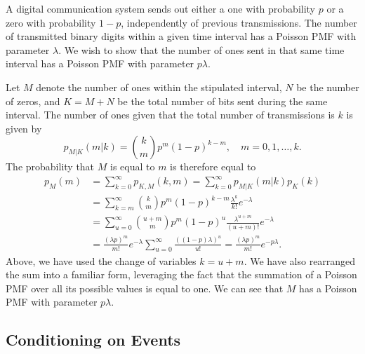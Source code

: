 \begin{example}
A digital communication system sends out either a one with probability $p$ or a zero with probability $1 - p$, independently of previous transmissions.
The number of transmitted binary digits within a given time interval has a Poisson PMF with parameter $\lambda$.
We wish to show that the number of ones sent in that same time interval has a Poisson PMF with parameter $p \lambda$.

Let $M$ denote the number of ones within the stipulated interval, $N$ be the number of zeros, and $K = M + N$ be the total number of bits sent during the same interval.
The number of ones given that the total number of transmissions is $k$ is given by
\begin{equation*}
p_{M|K} (m | k) = \binom{k}{m} p^m (1-p)^{k - m},
\quad m = 0, 1, \ldots, k.
\end{equation*}
The probability that $M$ is equal to $m$ is therefore equal to
\begin{equation*}
\begin{split}
p_{M} (m) &= \sum_{k = 0}^{\infty} p_{K,M} (k, m)
= \sum_{k = 0}^{\infty} p_{M|K} (m | k) p_K(k) \\
&= \sum_{k = m}^{\infty} \binom{k}{m} p^m (1-p)^{k - m}
\frac{\lambda^{k}}{k !} e^{-\lambda} \\
&= \sum_{u = 0}^{\infty} \binom{u+m}{m} p^m (1-p)^{u}
\frac{\lambda^{u+m}}{(u+m)!} e^{-\lambda} \\
&= \frac{(\lambda p)^m}{m!} e^{-\lambda}
\sum_{u = 0}^{\infty} \frac{( (1-p) \lambda)^{u}}{u!}
= \frac{(\lambda p)^m}{m!} e^{-p \lambda} .
\end{split}
\end{equation*}
Above, we have used the change of variables $k = u+m$.
We have also rearranged the sum into a familiar form, leveraging the fact that the summation of a Poisson PMF over all its possible values is equal to one.
We can see that $M$ has a Poisson PMF with parameter $p \lambda$.
\end{example}


\subsection{Conditioning on Events}

